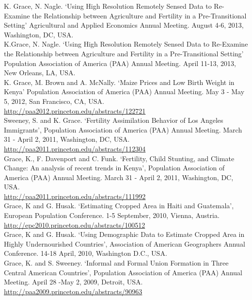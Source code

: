 \documentclass[11pt]{article} %
\begin{document}
\noindent
K. Grace, N. Nagle. `Using High Resolution Remotely Sensed Data to Re-Examine the Relationship between Agriculture and Fertility in a Pre-Transitional Setting'  Agricultural and Applied Economics Annual Meeting. August 4-6, 2013, Washington, DC, USA.\\

\noindent
K.Grace, N. Nagle. `Using High Resolution Remotely Sensed Data to Re-Examine the Relationship between Agriculture and Fertility in a Pre-Transitional Setting' Population Association of America (PAA) Annual Meeting.  April 11-13, 2013, New Orleans, LA, USA. \\

\noindent
K. Grace, M. Brown and A. McNally. `Maize Prices and Low Birth Weight in Kenya'  Population Association of America (PAA) Annual Meeting. May 3 - May 5, 2012, San Francisco, CA, USA.\\
\url{http://paa2012.princeton.edu/abstracts/122721}\\

\noindent
Sweeney, S. and K. Grace.  `Fertility Assimilation Behavior of Los Angeles Immigrants',
Population Association of America (PAA) Annual Meeting.  March 31 - April 2, 2011, Washington, DC, USA.\\
\url{http://paa2011.princeton.edu/abstracts/112304}\\

\noindent
Grace, K., F. Davenport and C. Funk.  `Fertility, Child Stunting, and Climate Change: An analysis of recent trends in Kenya',
Population Association of America (PAA) Annual Meeting.    March 31 - April 2, 2011, Washington, DC, USA.\\
\url{http://paa2011.princeton.edu/abstracts/111992}\\


\noindent
Grace, K and G. Husak. `Estimating Cropped Area in Haiti and Guatemala', European Population Conference. 1-5 September, 2010, Vienna, Austria.\\
\url{http://epc2010.princeton.edu/abstracts/100512}\\

\noindent
Grace, K and G. Husak. `Using Demographic Data to Estimate Cropped Area in Highly Undernourished Countries', Association of American Geographers Annual Conference. 14-18 April, 2010, Washington D.C., USA.\\

\noindent
Grace, K. and S. Sweeney.  `Informal and Formal Union Formation in Three Central American Countries',
Population Association of America (PAA) Annual Meeting.  April 28 -May 2, 2009, Detroit, USA.\\
\url{http://paa2009.princeton.edu/abstracts/90963}\\
\end{document}
